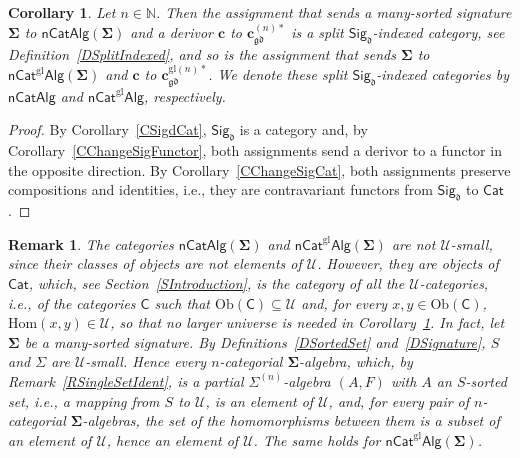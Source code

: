 \documentclass[a4paper, reqno
]{amsart}
\newcommand{\sig}[1]{\mathbf{#1}}             %
\newcommand{\gd}{\mathfrak{gd}}              %
\newcommand{\gl}{\mathrm{gl}}                %
\theoremstyle{plain}
\newtheorem{corollary}[theorem]{Corollary}
\newtheorem{remark}[theorem]{Remark}
\theoremstyle{definition}
\begin{document}
\begin{corollary}\label{CChangeSigIndexed}
Let $n\in\mathbb{N}$.
Then the assignment that sends a many-sorted signature $\sig{\Sigma}$ to $\mathsf{nCatAlg}(\sig{\Sigma})$ and a derivor $\mathbf{c}$ to $\mathbf{c}^{(n)\ast}_{\gd}$ is a split $\mathsf{Sig}_{\mathfrak{d}}$-indexed category, see Definition~\ref{DSplitIndexed}, and so is the assignment that sends $\sig{\Sigma}$ to $\mathsf{nCat}^{\gl}\mathsf{Alg}(\sig{\Sigma})$ and $\mathbf{c}$ to $\mathbf{c}^{\gl(n)\ast}_{\gd}$.
We denote these split $\mathsf{Sig}_{\mathfrak{d}}$-indexed categories by $\mathsf{nCatAlg}$ and $\mathsf{nCat}^{\gl}\mathsf{Alg}$, respectively.
\end{corollary}
\begin{proof}
By Corollary~\ref{CSigdCat}, $\mathsf{Sig}_{\mathfrak{d}}$ is a category and, by Corollary~\ref{CChangeSigFunctor}, both assignments send a derivor to a functor in the opposite direction.
By Corollary~\ref{CChangeSigCat}, both assignments preserve compositions and identities, i.e., they are contravariant functors from $\mathsf{Sig}_{\mathfrak{d}}$ to $\mathsf{Cat}$.
\end{proof}

\begin{remark}\label{RChangeSigIndexedSize}
The categories $\mathsf{nCatAlg}(\sig{\Sigma})$ and $\mathsf{nCat}^{\gl}\mathsf{Alg}(\sig{\Sigma})$ are not $\boldsymbol{\mathcal{U}}$-small, since their classes of objects are not elements of $\boldsymbol{\mathcal{U}}$.
However, they are objects of $\mathsf{Cat}$, which, see Section~\ref{SIntroduction}, is the category of all the $\boldsymbol{\mathcal{U}}$-categories, i.e., of the categories $\mathsf{C}$ such that $\mathrm{Ob}(\mathsf{C})\subseteq\boldsymbol{\mathcal{U}}$ and, for every $x,y\in\mathrm{Ob}(\mathsf{C})$, $\mathrm{Hom}(x,y)\in\boldsymbol{\mathcal{U}}$, so that no larger universe is needed in Corollary~\ref{CChangeSigIndexed}.
In fact, let $\sig{\Sigma}$ be a many-sorted signature.
By Definitions~\ref{DSortedSet} and~\ref{DSignature}, $S$ and $\Sigma$ are $\boldsymbol{\mathcal{U}}$-small.
Hence every $n$-categorial $\sig{\Sigma}$-algebra, which, by Remark~\ref{RSingleSetIdent}, is a partial $\Sigma^{(n)}$-algebra $(A,F)$ with $A$ an $S$-sorted set, i.e., a mapping from $S$ to $\boldsymbol{\mathcal{U}}$, is an element of $\boldsymbol{\mathcal{U}}$, and, for every pair of $n$-categorial $\sig{\Sigma}$-algebras, the set of the homomorphisms between them is a subset of an element of $\boldsymbol{\mathcal{U}}$, hence an element of $\boldsymbol{\mathcal{U}}$.
The same holds for $\mathsf{nCat}^{\gl}\mathsf{Alg}(\sig{\Sigma})$.
\end{remark}
\end{document}
